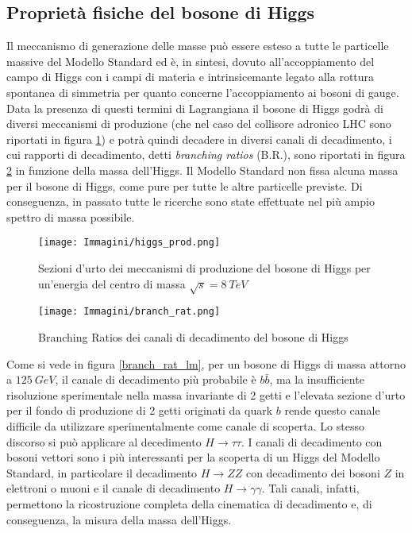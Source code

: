 \subsection{Proprietà fisiche del bosone di Higgs}\label{prop_higgs}
Il meccanismo di generazione delle masse può essere esteso a tutte le particelle massive del Modello Standard ed è, in sintesi, dovuto
all'accoppiamento del campo di Higgs con i campi di materia e intrinsicemante legato alla rottura spontanea di simmetria per quanto concerne l'accoppiamento ai bosoni di gauge.
Data la presenza di questi termini di Lagrangiana il bosone di Higgs godrà di diversi
meccanismi di produzione (che nel caso del collisore adronico LHC sono riportati in figura \ref{higgs_prod}) e potrà quindi decadere in diversi canali di decadimento, i cui rapporti di decadimento, detti \textit{branching ratios} (B.R.),
sono riportati in figura \ref{branch_rat} in funzione della massa dell'Higgs.
\newline
Il Modello Standard non fissa alcuna massa per il bosone di Higgs, come pure per tutte le altre particelle previste. Di conseguenza, 
in passato tutte le ricerche sono state effettuate nel più ampio spettro di massa possibile.

\begin{figure}[!htbp]
\begin{center}
\texttt{[image: Immagini/higgs\_prod.png]}
\end{center}
\caption[Sezioni d'urto dei meccanismi di produzione del bosone di Higgs]{Sezioni d'urto dei meccanismi di produzione del 
bosone di Higgs per un'energia del centro di massa $\sqrt{s}=8 ~TeV$}
\label{higgs_prod}
\end{figure}

\begin{figure}[!htbp]
\begin{center}
\texttt{[image: Immagini/branch\_rat.png]}
\end{center}
\caption{Branching Ratios dei canali di decadimento del bosone di Higgs}
\label{branch_rat}
\end{figure}

Come si vede in figura \ref{branch_rat_lm}, per un bosone di Higgs di massa attorno a $125 ~GeV$, il canale di decadimento più probabile è $b\bar{b}$, 
ma la insufficiente risoluzione sperimentale nella massa invariante di 2 getti e l'elevata sezione d'urto per il fondo di produzione di 2 getti originati da quark $b$ rende questo
canale difficile da utilizzare sperimentalmente come canale di scoperta. 
Lo stesso discorso si può applicare al decedimento $H\rightarrow\tau\tau$.
I canali di decadimento con bosoni vettori sono i più interessanti per la scoperta di un Higgs del Modello Standard,
in particolare il decadimento $H\rightarrow ZZ$ con decadimento dei bosoni $Z$ in elettroni o muoni e il canale di decadimento $H\rightarrow\gamma\gamma$.
Tali canali, infatti, permettono la ricostruzione completa della cinematica di decadimento e, di conseguenza, la misura della massa dell'Higgs.


